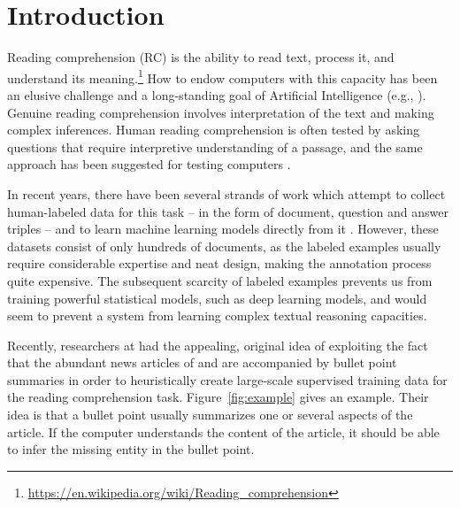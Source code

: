 \section{Introduction}

Reading comprehension (RC) is the ability to read text, process it, and understand its meaning.\footnote{\url{https://en.wikipedia.org/wiki/Reading_comprehension}} How to endow computers with this capacity has been an elusive challenge and a long-standing goal of Artificial Intelligence (e.g., \cite{norvig87phd}). Genuine reading comprehension involves interpretation of the text and making complex inferences. Human reading comprehension is often tested by asking questions that require interpretive understanding of a passage, and the same approach has been suggested for testing computers \cite{burges2013towards}.

In recent years, there have been several strands of work which attempt to collect human-labeled data for this task -- in the form of document, question and answer triples --  and to learn machine learning models directly from it \cite{richardson2013mctest,berant2014modeling,wang2015machine}. However, these datasets consist of only hundreds of documents, as the labeled examples usually require considerable expertise and neat design, making the annotation process quite expensive.  The subsequent scarcity of labeled examples prevents us from training powerful statistical models, such as deep learning models, and would seem to prevent a system from learning complex textual reasoning capacities.

Recently, researchers at  \cite{hermann2015teaching} had the appealing, original idea of exploiting the fact that the abundant news articles of  and  are accompanied by bullet point summaries in order to heuristically create large-scale supervised training data for the reading comprehension task. Figure~\ref{fig:example} gives an example. Their idea is that a bullet point usually summarizes one or several aspects of the article. If the computer understands the content of the article, it should be able to infer the missing entity in the bullet point.

